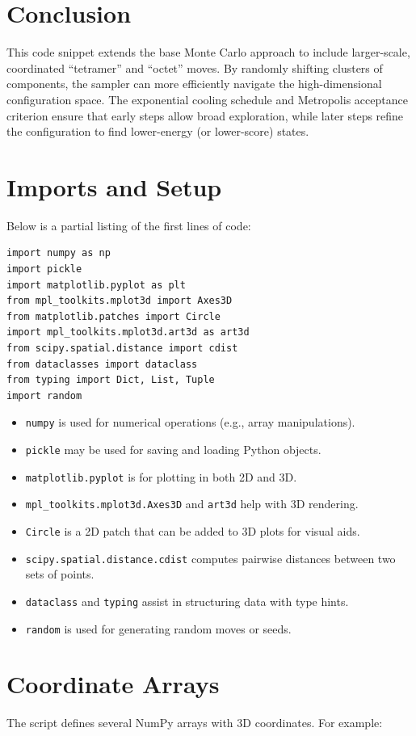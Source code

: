 \documentclass[12pt]{article}
\begin{document}
\section{Conclusion}
This code snippet extends the base Monte Carlo approach to 
include larger-scale, coordinated ``tetramer'' and ``octet'' moves. 
By randomly shifting clusters of components, the sampler can more 
efficiently navigate the high-dimensional configuration space. 
The exponential cooling schedule and Metropolis acceptance criterion 
ensure that early steps allow broad exploration, while later steps 
refine the configuration to find lower-energy (or lower-score) states.

\section{Imports and Setup}
Below is a partial listing of the first lines of code:

\begin{lstlisting}
import numpy as np
import pickle
import matplotlib.pyplot as plt
from mpl_toolkits.mplot3d import Axes3D
from matplotlib.patches import Circle
import mpl_toolkits.mplot3d.art3d as art3d
from scipy.spatial.distance import cdist
from dataclasses import dataclass
from typing import Dict, List, Tuple
import random
\end{lstlisting}

\begin{itemize}
  \item \texttt{numpy} is used for numerical operations (e.g., array manipulations).
  \item \texttt{pickle} may be used for saving and loading Python objects.
  \item \texttt{matplotlib.pyplot} is for plotting in both 2D and 3D.
  \item \texttt{mpl\_toolkits.mplot3d.Axes3D} and \texttt{art3d} help with 3D rendering.
  \item \texttt{Circle} is a 2D patch that can be added to 3D plots for visual aids.
  \item \texttt{scipy.spatial.distance.cdist} computes pairwise distances between two sets of points.
  \item \texttt{dataclass} and \texttt{typing} assist in structuring data with type hints.
  \item \texttt{random} is used for generating random moves or seeds.
\end{itemize}

\section{Coordinate Arrays}
The script defines several NumPy arrays with 3D coordinates. For example:
\end{document}
